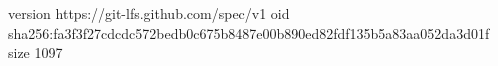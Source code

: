 version https://git-lfs.github.com/spec/v1
oid sha256:fa3f3f27cdcdc572bedb0c675b8487e00b890ed82fdf135b5a83aa052da3d01f
size 1097
